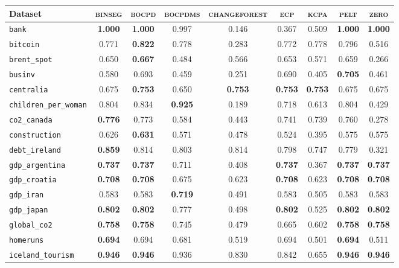 \begin{tabular}{lcccccccc}
Dataset & \textsc{binseg} & \textsc{bocpd} & \textsc{bocpdms} & \textsc{changeforest} & \textsc{ecp} & \textsc{kcpa} & \textsc{pelt} & \textsc{zero}\\
\toprule
\verb+bank+ & \textbf{1.000} & \textbf{1.000} & 0.997 & 0.146 & 0.367 & 0.509 & \textbf{1.000} & \textbf{1.000}\\
\verb+bitcoin+ & 0.771 & \textbf{0.822} & 0.778 & 0.283 & 0.772 & 0.778 & 0.796 & 0.516\\
\verb+brent_spot+ & 0.650 & \textbf{0.667} & 0.484 & 0.566 & 0.653 & 0.571 & 0.659 & 0.266\\
\verb+businv+ & 0.580 & 0.693 & 0.459 & 0.251 & 0.690 & 0.405 & \textbf{0.705} & 0.461\\
\verb+centralia+ & 0.675 & \textbf{0.753} & 0.650 & \textbf{0.753} & \textbf{0.753} & \textbf{0.753} & 0.675 & 0.675\\
\verb+children_per_woman+ & 0.804 & 0.834 & \textbf{0.925} & 0.189 & 0.718 & 0.613 & 0.804 & 0.429\\
\verb+co2_canada+ & \textbf{0.776} & 0.773 & 0.584 & 0.443 & 0.741 & 0.739 & 0.760 & 0.278\\
\verb+construction+ & 0.626 & \textbf{0.631} & 0.571 & 0.478 & 0.524 & 0.395 & 0.575 & 0.575\\
\verb+debt_ireland+ & \textbf{0.859} & 0.814 & 0.803 & 0.814 & 0.798 & 0.747 & 0.779 & 0.321\\
\verb+gdp_argentina+ & \textbf{0.737} & \textbf{0.737} & 0.711 & 0.408 & \textbf{0.737} & 0.367 & \textbf{0.737} & \textbf{0.737}\\
\verb+gdp_croatia+ & \textbf{0.708} & \textbf{0.708} & 0.675 & 0.623 & \textbf{0.708} & 0.623 & \textbf{0.708} & \textbf{0.708}\\
\verb+gdp_iran+ & 0.583 & 0.583 & \textbf{0.719} & 0.491 & 0.583 & 0.505 & 0.583 & 0.583\\
\verb+gdp_japan+ & \textbf{0.802} & \textbf{0.802} & 0.777 & 0.498 & \textbf{0.802} & 0.525 & \textbf{0.802} & \textbf{0.802}\\
\verb+global_co2+ & \textbf{0.758} & \textbf{0.758} & 0.745 & 0.479 & 0.665 & 0.602 & \textbf{0.758} & \textbf{0.758}\\
\verb+homeruns+ & \textbf{0.694} & 0.694 & 0.681 & 0.519 & 0.694 & 0.501 & \textbf{0.694} & 0.511\\
\verb+iceland_tourism+ & \textbf{0.946} & \textbf{0.946} & 0.936 & 0.830 & 0.842 & 0.655 & \textbf{0.946} & \textbf{0.946}\\

\end{tabular}
